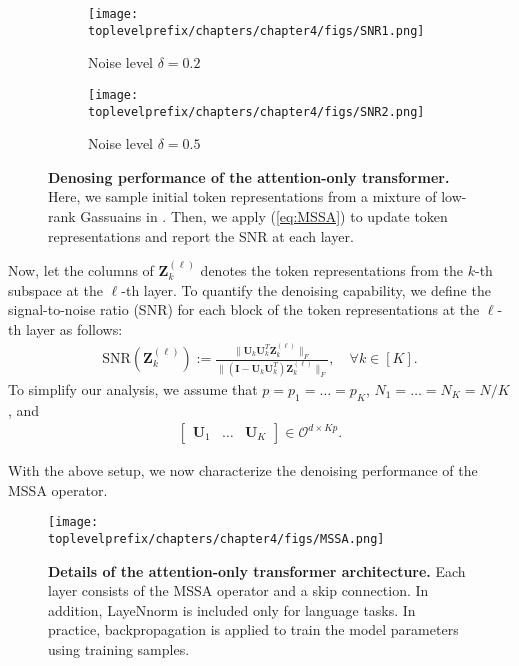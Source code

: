\documentclass[../../book-main.tex]{subfiles}
\begin{document}
\begin{figure}[t]
    \begin{subfigure}[t]{0.45\textwidth}
        \centering
        \texttt{[image: \\toplevelprefix/chapters/chapter4/figs/SNR1.png]}
        \caption{Noise level $\delta = 0.2$}
    \end{subfigure}
    \hfill
    \begin{subfigure}[t]{0.45\textwidth}
        \centering
        \texttt{[image: \\toplevelprefix/chapters/chapter4/figs/SNR2.png]}
        \caption{Noise level $\delta = 0.5$}
    \end{subfigure}
    \caption{{\bf Denosing performance of the attention-only transformer.} Here, we sample initial token representations from a mixture of low-rank Gassuains in . Then, we apply (\ref{eq:MSSA}) to update token representations and report the SNR at each layer.}  \label{fig:MSSA} 
\end{figure} 


Now, let the columns of $\bm Z_k^{(\ell)}$ denotes the token representations from the $k$-th subspace at the $\ell$-th layer. To quantify the denoising capability, we define the signal-to-noise ratio (SNR) for each block of the token representations at the $\ell$-th layer as follows: 
\begin{align}\label{def:SNR}
\mathrm{SNR}(\bm Z_k^{(\ell)}) :=  \frac{\|\bm U_k\bm U_k^T\bm Z_k^{(\ell)} \|_F}{\|(\bm I - \bm U_k\bm U_k^T)\bm Z_k^{(\ell)} \|_F},\quad \forall k \in [K].
\end{align}
To simplify our analysis, we assume that $p=p_1=\dots=p_K$, $N_1=\dots=N_K=N/K$, and 
\begin{align}\label{eq:orth}
\begin{bmatrix}
\bm U_1 & \dots & \bm U_K
\end{bmatrix} \in \mathcal{O}^{d\times Kp}. 
\end{align}  

With the above setup, we now characterize the denoising performance of the MSSA operator.

\begin{figure*}[t]
\begin{center}
        \texttt{[image: \\toplevelprefix/chapters/chapter4/figs/MSSA.png]}
    \caption{\textbf{Details of the attention-only transformer architecture.} Each layer consists of the MSSA operator and a skip connection. In addition, LayeNnorm is included only for language tasks. In practice, backpropagation is applied to train the model parameters using training samples. %
    }\label{fig:transformer}
\end{center} 
\end{figure*}
\end{document}
